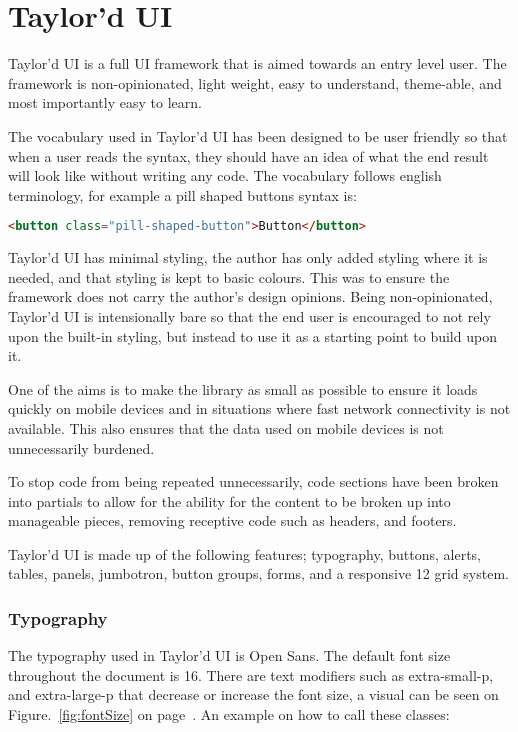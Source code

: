 \newpage
\chapter*{Taylor'd UI}

Taylor'd UI is a full \gls{UI} framework that is aimed towards an entry level user. The framework is non-opinionated, light weight, easy to understand, theme-able, and most importantly easy to learn. 

The vocabulary used in Taylor'd UI has been designed to be user friendly so that when a user reads the syntax, they should have an idea of what the end result will look like without writing any code. The vocabulary follows english terminology, for example a pill shaped buttons syntax is: 

\begin{lstlisting}[language=HTML]
<button class="pill-shaped-button">Button</button>
\end{lstlisting}

Taylor'd UI has minimal styling, the author has only added styling where it is needed, and that styling is kept to basic colours. This was to ensure the framework does not carry the author's design opinions. Being non-opinionated, Taylor'd UI is intensionally bare so that the end user is encouraged to not rely upon the built-in styling, but instead to use it as a starting point to build upon it. 

One of the aims is to make the library as small as possible to ensure it loads quickly on mobile devices and in situations where fast network connectivity is not available. This also ensures that the data used on mobile devices is not unnecessarily burdened.

To stop code from being repeated unnecessarily, code sections have been broken into partials to allow for the ability for the content to be broken up into manageable pieces, removing receptive code such as headers, and footers.

Taylor'd UI is made up of the following features; typography, buttons, alerts, tables, panels, jumbotron, button groups, forms, and a responsive 12 grid system.

\newpage
\subsection*{Typography}
The typography used in Taylor'd UI is Open Sans. The default font size throughout the document is 16. There are text modifiers such as extra-small-p, and extra-large-p that decrease or increase the font size, a visual can be seen on Figure.~\ref{fig:fontSize} on  page~\pageref{fig:fontSize}. An example on how to call these classes: 

